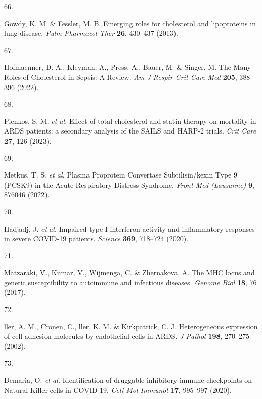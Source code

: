 \documentclass[
  11,
  a4paper,
]{article}
\newlength{\cslhangindent}
\newlength{\csllabelwidth}
\newlength{\cslentryspacingunit} %
\newenvironment{CSLReferences}[2] %
 {%
  \setlength{\parindent}{0pt}
  \ifodd #1
  \let\oldpar\par
  \def\par{\hangindent=\cslhangindent\oldpar}
  \fi
  \setlength{\parskip}{#2\cslentryspacingunit}
 }%
 {}
\newcommand{\CSLLeftMargin}[1]{\parbox[t]{\csllabelwidth}{#1}}
\newcommand{\CSLRightInline}[1]{\parbox[t]{\linewidth - \csllabelwidth}{#1}\break}
\begin{document}
\begin{CSLReferences}{0}{0}
\leavevmode{}%
\CSLLeftMargin{66. }%
\CSLRightInline{Gowdy, K. M. \& Fessler, M. B. {{E}merging roles for
cholesterol and lipoproteins in lung disease}. \emph{Pulm Pharmacol
Ther} \textbf{26}, 430--437 (2013).}

\leavevmode{}%
\CSLLeftMargin{67. }%
\CSLRightInline{Hofmaenner, D. A., Kleyman, A., Press, A., Bauer, M. \&
Singer, M. {{T}he {M}any {R}oles of {C}holesterol in {S}epsis: {A}
{R}eview}. \emph{Am J Respir Crit Care Med} \textbf{205}, 388--396
(2022).}

\leavevmode{}%
\CSLLeftMargin{68. }%
\CSLRightInline{Pienkos, S. M. \emph{et al.} {{E}ffect of total
cholesterol and statin therapy on mortality in {A}{R}{D}{S} patients: a
secondary analysis of the {S}{A}{I}{L}{S} and {H}{A}{R}{P}-2 trials}.
\emph{Crit Care} \textbf{27}, 126 (2023).}

\leavevmode{}%
\CSLLeftMargin{69. }%
\CSLRightInline{Metkus, T. S. \emph{et al.} {{P}lasma {P}roprotein
{C}onvertase {S}ubtilisin/kexin {T}ype 9 ({P}{C}{S}{K}9) in the {A}cute
{R}espiratory {D}istress {S}yndrome}. \emph{Front Med (Lausanne)}
\textbf{9}, 876046 (2022).}

\leavevmode{}%
\CSLLeftMargin{70. }%
\CSLRightInline{Hadjadj, J. \emph{et al.} {{I}mpaired type {I}
interferon activity and inflammatory responses in severe
{C}{O}{V}{I}{D}-19 patients}. \emph{Science} \textbf{369}, 718--724
(2020).}

\leavevmode{}%
\CSLLeftMargin{71. }%
\CSLRightInline{Matzaraki, V., Kumar, V., Wijmenga, C. \& Zhernakova, A.
{{T}he {M}{H}{C} locus and genetic susceptibility to autoimmune and
infectious diseases}. \emph{Genome Biol} \textbf{18}, 76 (2017).}

\leavevmode{}%
\CSLLeftMargin{72. }%
\CSLRightInline{ller, A. M., Cronen, C., ller, K. M. \& Kirkpatrick, C.
J. {{H}eterogeneous expression of cell adhesion molecules by endothelial
cells in {A}{R}{D}{S}}. \emph{J Pathol} \textbf{198}, 270--275 (2002).}

\leavevmode{}%
\CSLLeftMargin{73. }%
\CSLRightInline{Demaria, O. \emph{et al.} {{I}dentification of druggable
inhibitory immune checkpoints on {N}atural {K}iller cells in
{C}{O}{V}{I}{D}-19}. \emph{Cell Mol Immunol} \textbf{17}, 995--997
(2020).}


\end{CSLReferences}
\end{document}

